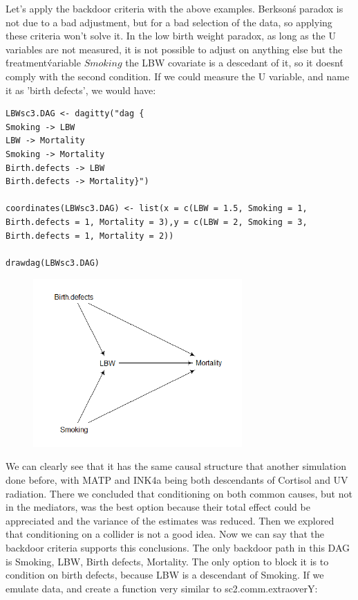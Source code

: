 \documentclass{article}
\begin{document}
Let's apply the backdoor criteria with the above examples. 
Berkson\'s paradox is not due to a bad adjustment, but for a bad selection of the data, so applying these criteria won't solve it.
In the low birth weight paradox, as long as the U variables are not measured, it is not possible to adjust on anything else but the \'treatment\' variable \(Smoking\)\: the LBW covariate is a descedant of it, so it doesn\'t comply with the second condition. If we could measure the U variable, and name it as 'birth defects', we would have:
\begin{lstlisting}
LBWsc3.DAG <- dagitty("dag {
Smoking -> LBW
LBW -> Mortality
Smoking -> Mortality
Birth.defects -> LBW
Birth.defects -> Mortality}")

coordinates(LBWsc3.DAG) <- list(x = c(LBW = 1.5, Smoking = 1, Birth.defects = 1, Mortality = 3),y = c(LBW = 2, Smoking = 3, Birth.defects = 1, Mortality = 2))

drawdag(LBWsc3.DAG)
\end{lstlisting}
\begin{figure}[h]
\includegraphics[width=8cm]{LBW3.DAG.png}
\centering
\end{figure}
We can clearly see that it has the same causal structure that another simulation done before, with MATP and INK4a being both descendants of Cortisol and UV radiation. There we concluded that conditioning on both common causes, but not in the mediators, was the best option because their total effect could be appreciated and the variance of the estimates was reduced. Then we explored that conditioning on a collider is not a good idea. Now we can say that the backdoor criteria supports this conclusions. The only backdoor path in this DAG is Smoking, LBW, Birth defects, Mortality. The only option to block it is to condition on birth defects, because LBW is a descendant of Smoking. If we emulate data, and create a function very similar to sc2.comm.extraoverY:
\end{document}

